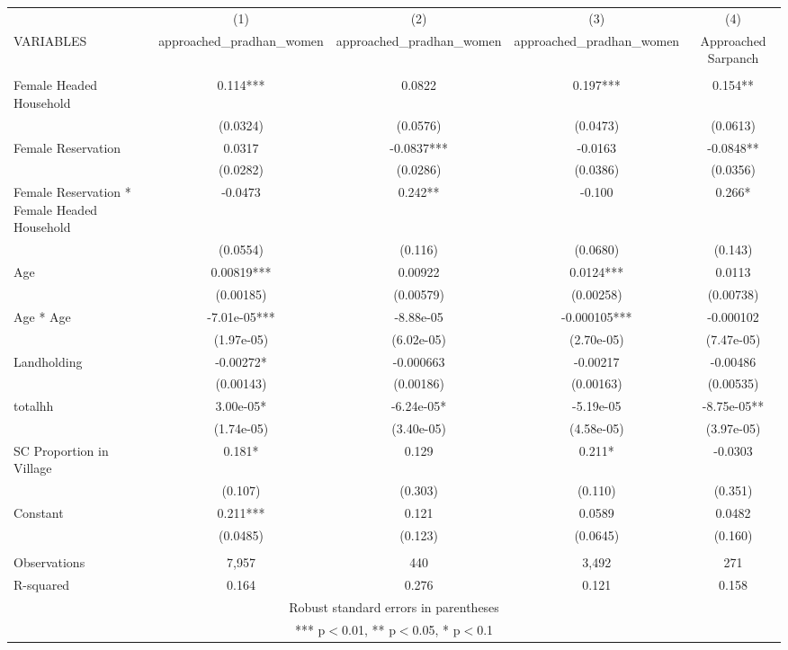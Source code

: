 \documentclass[]{article}
\begin{document}
\begin{tabular}{lcccc} \hline
 & (1) & (2) & (3) & (4) \\
VARIABLES & approached\_pradhan\_women & approached\_pradhan\_women & approached\_pradhan\_women & Approached Sarpanch \\ \hline
 &  &  &  &  \\
Female Headed Household & 0.114*** & 0.0822 & 0.197*** & 0.154** \\
 & (0.0324) & (0.0576) & (0.0473) & (0.0613) \\
Female Reservation & 0.0317 & -0.0837*** & -0.0163 & -0.0848** \\
 & (0.0282) & (0.0286) & (0.0386) & (0.0356) \\
Female Reservation * Female Headed Household & -0.0473 & 0.242** & -0.100 & 0.266* \\
 & (0.0554) & (0.116) & (0.0680) & (0.143) \\
Age & 0.00819*** & 0.00922 & 0.0124*** & 0.0113 \\
 & (0.00185) & (0.00579) & (0.00258) & (0.00738) \\
Age * Age & -7.01e-05*** & -8.88e-05 & -0.000105*** & -0.000102 \\
 & (1.97e-05) & (6.02e-05) & (2.70e-05) & (7.47e-05) \\
Landholding & -0.00272* & -0.000663 & -0.00217 & -0.00486 \\
 & (0.00143) & (0.00186) & (0.00163) & (0.00535) \\
totalhh & 3.00e-05* & -6.24e-05* & -5.19e-05 & -8.75e-05** \\
 & (1.74e-05) & (3.40e-05) & (4.58e-05) & (3.97e-05) \\
SC Proportion in Village & 0.181* & 0.129 & 0.211* & -0.0303 \\
 & (0.107) & (0.303) & (0.110) & (0.351) \\
Constant & 0.211*** & 0.121 & 0.0589 & 0.0482 \\
 & (0.0485) & (0.123) & (0.0645) & (0.160) \\
 &  &  &  &  \\
Observations & 7,957 & 440 & 3,492 & 271 \\
 R-squared & 0.164 & 0.276 & 0.121 & 0.158 \\ \hline
\multicolumn{5}{c}{ Robust standard errors in parentheses} \\
\multicolumn{5}{c}{ *** p$<$0.01, ** p$<$0.05, * p$<$0.1} \\
\end{tabular}
\end{document}
